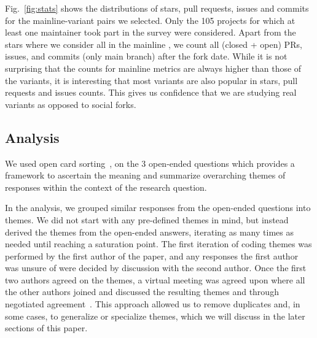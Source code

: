 Fig.~\ref{fig:stats} shows the distributions of stars, pull requests, issues and commits for the mainline-variant pairs we selected. Only the 105 projects for which at least one maintainer took part in the survey were considered.
Apart from the stars where we consider all in the mainline
, we count all (closed + open) PRs, issues, and commits (only main branch) after the fork date. While it is not surprising that the counts for mainline metrics are always higher than those of the variants, it is interesting that most variants are also popular in stars, pull requests and issues counts. This gives us confidence that we are studying real variants as opposed to social forks.


\subsection{Analysis}
\label{sec:card_sorting}


We used open card sorting~\cite{zimmermann2016card}, on the 3 open-ended questions which provides a framework to ascertain the meaning and summarize overarching themes of responses within the context of the research question. 

In the analysis, we grouped similar responses from the open-ended questions into themes. 
We did not start with any pre-defined themes in mind, but instead derived the themes from the open-ended answers, iterating as many times as needed until reaching a saturation point. The first iteration of coding themes was performed by the first author of the paper, and any responses the first author was unsure of were decided by discussion with the second author. Once the first two authors agreed on the themes, a virtual meeting was agreed upon where all the other authors joined and discussed the resulting themes and through negotiated agreement~\cite{Garrison:2006}. This approach allowed us to remove duplicates and, in some cases, to generalize or specialize themes, which we will discuss in the later sections of this paper.

